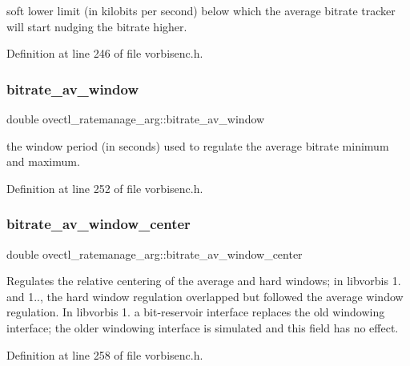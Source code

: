 soft lower limit (in kilobits per second) below which the average bitrate tracker will start nudging the bitrate higher. 

Definition at line 246 of file vorbisenc.\+h.

\mbox{\label{structovectl__ratemanage__arg_a1232e7296ae5e52f52039bed2560c505}} 
\subsubsection{\texorpdfstring{bitrate\_av\_window}{bitrate\_av\_window}}
{\footnotesize\ttfamily double ovectl\+\_\+ratemanage\+\_\+arg\+::bitrate\+\_\+av\+\_\+window}

the window period (in seconds) used to regulate the average bitrate minimum and maximum. 

Definition at line 252 of file vorbisenc.\+h.

\mbox{\label{structovectl__ratemanage__arg_aad317d50fb4d072e2c55f0a60d1a83b2}} 
\subsubsection{\texorpdfstring{bitrate\_av\_window\_center}{bitrate\_av\_window\_center}}
{\footnotesize\ttfamily double ovectl\+\_\+ratemanage\+\_\+arg\+::bitrate\+\_\+av\+\_\+window\+\_\+center}

Regulates the relative centering of the average and hard windows; in libvorbis 1. and 1.., the hard window regulation overlapped but followed the average window regulation. In libvorbis 1. a bit-\/reservoir interface replaces the old windowing interface; the older windowing interface is simulated and this field has no effect. 

Definition at line 258 of file vorbisenc.\+h.

\mbox{\label{structovectl__ratemanage__arg_a3620024b5a9e4b4df6d20deb6c125c92}} 
